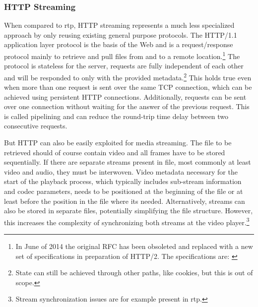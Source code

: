 \subsubsection{\texorpdfstring{\acrshort{HTTP}}{HTTP} Streaming}

When compared to \gls{rtp}, \gls{HTTP} streaming represents a much less specialized approach by only reusing existing general purpose protocols. The \gls{HTTP}/1.1~\autocite{rfc2616} application layer protocol is the basis of the Web and is a request/response protocol mainly to retrieve and pull files from and to a remote location.\footnote{In June of 2014 the original \acrshort{RFC} has been obsoleted and replaced with a new set of specifications in preparation of \gls{HTTP}/2. The specifications are: \autocite{rfc7230,rfc7231,rfc7232,rfc7233,rfc7234,rfc7235,rfc7236,rfc7237,rfc7238,rfc7239}} The protocol is stateless for the server, requests are fully independent of each other and will be responded to only with the provided metadata.\footnote{State can still be achieved through other paths, like cookies, but this is out of scope.} This holds true even when more than one request is sent over the same \gls{TCP} connection, which can be achieved using persistent \gls{HTTP} connections. Additionally, requests can be sent over one connection without waiting for the answer of the previous request. This is called pipelining and can reduce the round-trip time delay between two consecutive requests.

But \gls{HTTP} can also be easily exploited for media streaming. The file to be retrieved should of course contain video and all frames have to be stored sequentially. If there are separate streams present in file, most commonly at least video and audio, they must be interwoven. Video metadata necessary for the start of the playback process, which typically includes sub-stream information and codec parameters, needs to be positioned at the beginning of the file or at least before the position in the file where its needed. Alternatively, streams can also be stored in separate files, potentially simplifying the file structure. However, this increases the complexity of synchronizing both streams at the video player.\footnote{Stream synchronization issues are for example present in \gls{rtp}.}

